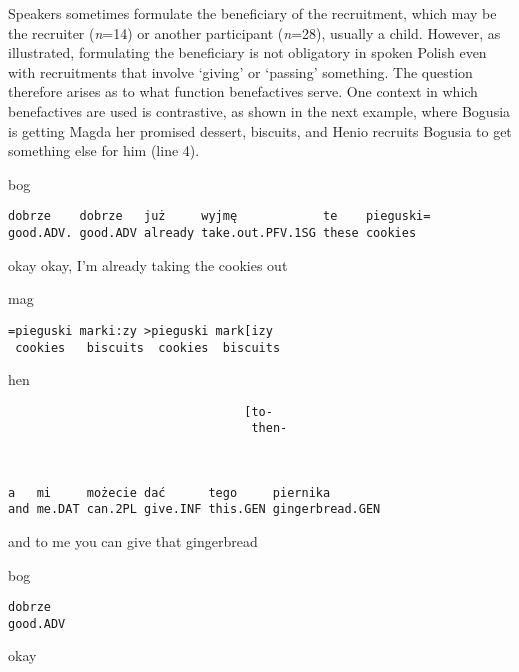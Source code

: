 \documentclass[output=paper]{langsci/langscibook}
\begin{document}
Speakers sometimes formulate the beneficiary of the recruitment, which may be the recruiter (\textit{n}=14) or another participant (\textit{n}=28), usually a child. However, as  illustrated, formulating the beneficiary is not obligatory in spoken Polish even with recruitments that involve ‘giving’ or ‘passing’ something.  The question therefore arises as to what function benefactives serve.  One context in which benefactives are used is contrastive, as shown in the next example, where Bogusia is getting Magda her promised dessert, biscuits, and Henio recruits Bogusia to get something else for him (line 4).

\vspace{2mm}
%
\begin{transbox}{1}{bog}
\begin{verbatim}
dobrze    dobrze   już     wyjmę            te    pieguski=
good.ADV. good.ADV already take.out.PFV.1SG these cookies
\end{verbatim}
okay okay, I’m already taking the cookies out
\end{transbox}
%
\begin{transbox}{2}{mag}
\begin{verbatim}
=pieguski marki:zy >pieguski mark[izy
 cookies   biscuits  cookies  biscuits
\end{verbatim}
\end{transbox}
%
\begin{transbox}{3}{hen}
\begin{verbatim}
                                 [to-
                                  then-
\end{verbatim}
\end{transbox}
%
\begin{mdframednoverticalspace}[style=firstfoc]
\begin{transbox}{4}{~}
\begin{verbatim}
a   mi     możecie dać      tego     piernika
and me.DAT can.2PL give.INF this.GEN gingerbread.GEN
\end{verbatim}
and to me you can give that gingerbread
\end{transbox}
\end{mdframednoverticalspace}
%
%
\begin{mdframednoverticalspace}[style=secondfoc]
\begin{transbox}{6}{bog}
\begin{verbatim}
dobrze
good.ADV
\end{verbatim}
okay
\end{transbox}
\end{mdframednoverticalspace}
%
\begin{mdframednoverticalspace}[style=secondfoc]
\end{mdframednoverticalspace}\vspace{-2mm}
\end{document}
